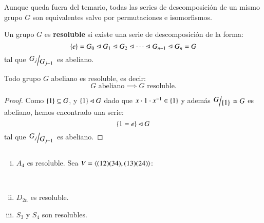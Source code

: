 \begin{obs}
    Aunque queda fuera del temario, todas las series de descomposición de un mismo grupo $G$ son equivalentes salvo por permutaciones e isomorfismos.
\end{obs}

\begin{dfn}
    Un grupo $G$ es \textbf{resoluble} si existe una serie de descomposición de la forma:
    $$
        \left\{e\right\} = G_0 \trianglelefteq G_1 \trianglelefteq G_2 \trianglelefteq \cdots \trianglelefteq G_{n-1} \trianglelefteq G_n = G
    $$
    tal que $\quo{G_j}{G_{j-1}}$ es abeliano.
\end{dfn}

\begin{pro}
    Todo grupo $G$ abeliano es resoluble, es decir:
    $$
        G \text{ abeliano} \implies G \text{ resoluble.}
    $$
\end{pro}
\begin{proof}
    Como $\left\{1\right\} \subseteq G$, y $\left\{1\right\} \lhd G$ dado que $x \cdot 1 \cdot x^{-1} \in \left\{1\right\}$ y además $\quo{G}{\sdf{1}} \isom G$ es abeliano, hemos encontrado una serie:
    $$
        \left\{1 = e\right\} \lhd G
    $$
    tal que $\quo{G_j}{G_{j-1}}$ es abeliano.
\end{proof}
\begin{eg}$ $
    \begin{enumerate}[i)]
        \item $A_4$ es resoluble. Sea $V = \langle(12)(34), (13)(24)\rangle$:\\

        \begin{center}
            \\
        \end{center}
        \item $D_{2n}$ es resoluble.
        \item $S_3$ y $S_4$ son resolubles.
    \end{enumerate}
\end{eg}

